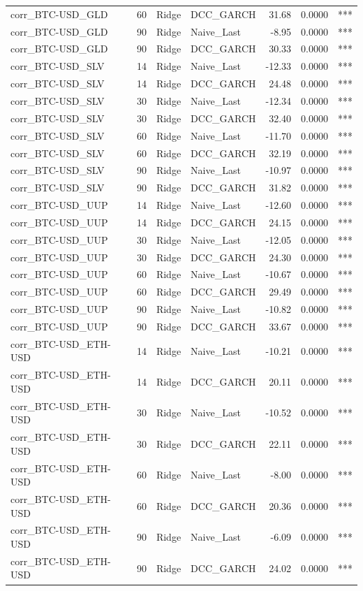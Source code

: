 \begin{table}[H]
\begin{tabular}{llllrrl}
corr_BTC-USD_GLD & 60 & Ridge & DCC_GARCH & 31.68 & 0.0000 & *** \\
corr_BTC-USD_GLD & 90 & Ridge & Naive_Last & -8.95 & 0.0000 & *** \\
corr_BTC-USD_GLD & 90 & Ridge & DCC_GARCH & 30.33 & 0.0000 & *** \\
corr_BTC-USD_SLV & 14 & Ridge & Naive_Last & -12.33 & 0.0000 & *** \\
corr_BTC-USD_SLV & 14 & Ridge & DCC_GARCH & 24.48 & 0.0000 & *** \\
corr_BTC-USD_SLV & 30 & Ridge & Naive_Last & -12.34 & 0.0000 & *** \\
corr_BTC-USD_SLV & 30 & Ridge & DCC_GARCH & 32.40 & 0.0000 & *** \\
corr_BTC-USD_SLV & 60 & Ridge & Naive_Last & -11.70 & 0.0000 & *** \\
corr_BTC-USD_SLV & 60 & Ridge & DCC_GARCH & 32.19 & 0.0000 & *** \\
corr_BTC-USD_SLV & 90 & Ridge & Naive_Last & -10.97 & 0.0000 & *** \\
corr_BTC-USD_SLV & 90 & Ridge & DCC_GARCH & 31.82 & 0.0000 & *** \\
corr_BTC-USD_UUP & 14 & Ridge & Naive_Last & -12.60 & 0.0000 & *** \\
corr_BTC-USD_UUP & 14 & Ridge & DCC_GARCH & 24.15 & 0.0000 & *** \\
corr_BTC-USD_UUP & 30 & Ridge & Naive_Last & -12.05 & 0.0000 & *** \\
corr_BTC-USD_UUP & 30 & Ridge & DCC_GARCH & 24.30 & 0.0000 & *** \\
corr_BTC-USD_UUP & 60 & Ridge & Naive_Last & -10.67 & 0.0000 & *** \\
corr_BTC-USD_UUP & 60 & Ridge & DCC_GARCH & 29.49 & 0.0000 & *** \\
corr_BTC-USD_UUP & 90 & Ridge & Naive_Last & -10.82 & 0.0000 & *** \\
corr_BTC-USD_UUP & 90 & Ridge & DCC_GARCH & 33.67 & 0.0000 & *** \\
corr_BTC-USD_ETH-USD & 14 & Ridge & Naive_Last & -10.21 & 0.0000 & *** \\
corr_BTC-USD_ETH-USD & 14 & Ridge & DCC_GARCH & 20.11 & 0.0000 & *** \\
corr_BTC-USD_ETH-USD & 30 & Ridge & Naive_Last & -10.52 & 0.0000 & *** \\
corr_BTC-USD_ETH-USD & 30 & Ridge & DCC_GARCH & 22.11 & 0.0000 & *** \\
corr_BTC-USD_ETH-USD & 60 & Ridge & Naive_Last & -8.00 & 0.0000 & *** \\
corr_BTC-USD_ETH-USD & 60 & Ridge & DCC_GARCH & 20.36 & 0.0000 & *** \\
corr_BTC-USD_ETH-USD & 90 & Ridge & Naive_Last & -6.09 & 0.0000 & *** \\
corr_BTC-USD_ETH-USD & 90 & Ridge & DCC_GARCH & 24.02 & 0.0000 & *** \\
\bottomrule
\end{tabular}
\end{table}